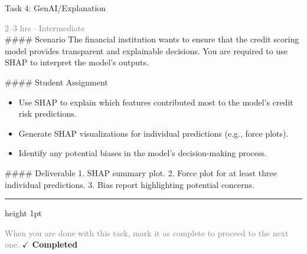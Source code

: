\documentclass[10pt,a4paper]{article}
\begin{document}
\begin{taskbox}{Task 4: GenAI/Explanation}

    {\small \textcolor{gray}{2--3 hrs $\cdot$ Intermediate}}\\[12pt]

    \#\#\#\# Scenario  
The financial institution wants to ensure that the credit scoring model provides transparent and explainable decisions. You are required to use SHAP to interpret the model’s outputs.  

\#\#\#\# Student Assignment  
\begin{itemize}
    \item Use SHAP to explain which features contributed most to the model’s credit risk predictions.  
    \item Generate SHAP visualizations for individual predictions (e.g., force plots).  
    \item Identify any potential biases in the model’s decision-making process.  
\end{itemize}

\#\#\#\# Deliverable  
1. SHAP summary plot.  
2. Force plot for at least three individual predictions.  
3. Bias report highlighting potential concerns.\par

    \vspace{16pt}

    \textcolor{cardBorder}{\hrule height 1pt}\vspace{8pt}

    \small \textcolor{gray}{When you are done with this task, mark it as complete to proceed to the next one.} \hfill \textbf{\textcolor{brandDark}{$\checkmark$ Completed}}

\end{taskbox}
\end{document}
